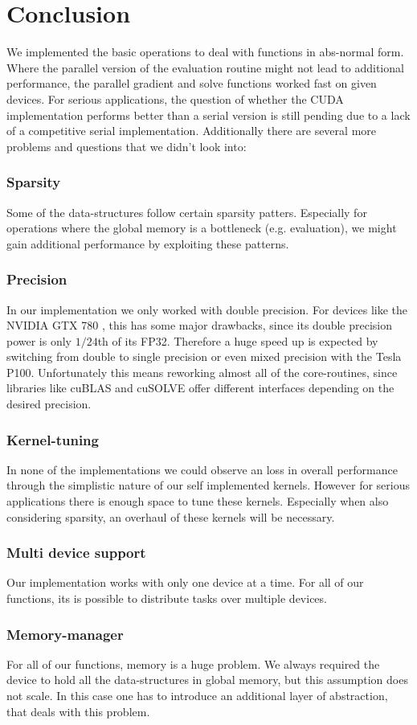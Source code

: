 \section{Conclusion}
We implemented the basic operations to deal with functions in abs-normal form. Where the parallel version of the evaluation routine might not lead to additional performance, the parallel gradient and solve functions worked fast on given devices. For serious applications, the question of whether the CUDA implementation performs better than a serial version is still pending due to a lack of a competitive serial implementation. Additionally there are several more problems and questions that we didn't look into:

\subsubsection{Sparsity}
Some of the data-structures follow certain sparsity patters. Especially for operations where the global memory is a bottleneck (e.g. evaluation), we might gain additional performance by exploiting these patterns.

\subsubsection{Precision}
In our implementation we only worked with double precision. For devices like the NVIDIA GTX 780 , this has some major drawbacks, since its double precision power is only $1/24$th of its FP32. Therefore a huge speed up is expected by switching from double to single precision or even mixed precision with the Tesla P100.
Unfortunately this means reworking almost all of the core-routines, since libraries like cuBLAS and cuSOLVE offer different interfaces depending on the desired precision.

\subsubsection{Kernel-tuning}
In none of the implementations we could observe an loss in overall performance through the simplistic nature of our self implemented kernels. However for serious applications there is enough space to tune these kernels. Especially when also considering sparsity, an overhaul of these kernels will be necessary.

\subsubsection{Multi device support}
Our implementation works with only one device at a time. For all of our functions, its is possible to distribute tasks over multiple devices.

\subsubsection{Memory-manager}
For all of our functions, memory is a huge problem. We always required the device to hold all the data-structures in global memory, but this assumption does not scale. In this case one has to introduce an additional layer of abstraction, that deals with this problem. 